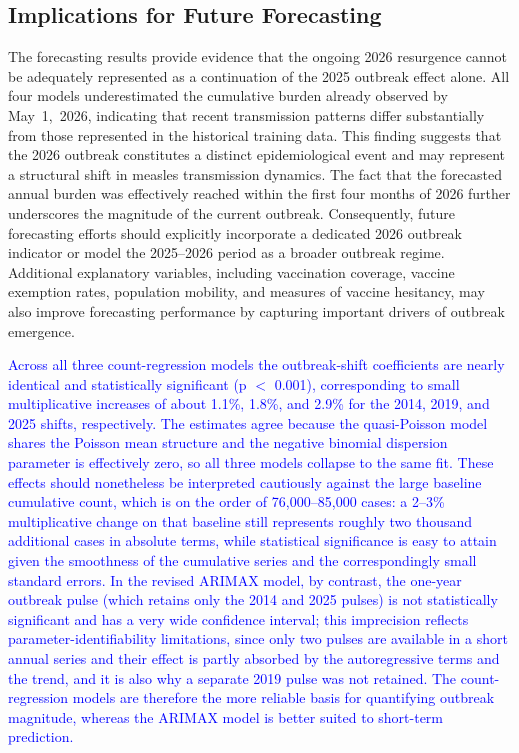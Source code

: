 \documentclass[utf8]{FrontiersinHarvard} %
\begin{document}
\subsection{Implications for Future Forecasting}
The forecasting results provide evidence that the ongoing 2026 resurgence cannot be adequately represented as a continuation of the 2025 outbreak effect alone. All four models underestimated the cumulative burden already observed by May~1,~2026, indicating that recent transmission patterns differ substantially from those represented in the historical training data. This finding suggests that the 2026 outbreak constitutes a distinct epidemiological event and may represent a structural shift in measles transmission dynamics.
The fact that the forecasted annual burden was effectively reached within the first four months of 2026 further underscores the magnitude of the current outbreak. Consequently, future forecasting efforts should explicitly incorporate a dedicated 2026 outbreak indicator or model the 2025--2026 period as a broader outbreak regime. Additional explanatory variables, including vaccination coverage, vaccine exemption rates, population mobility, and measures of vaccine hesitancy, may also improve forecasting performance by capturing important drivers of outbreak emergence.

\textcolor{blue}{Across all three count-regression models the outbreak-shift coefficients are nearly identical and statistically significant (p $<$ 0.001), corresponding to small multiplicative increases of about 1.1\%, 1.8\%, and 2.9\% for the 2014, 2019, and 2025 shifts, respectively. The estimates agree because the quasi-Poisson model shares the Poisson mean structure and the negative binomial dispersion parameter is effectively zero, so all three models collapse to the same fit. These effects should nonetheless be interpreted cautiously against the large baseline cumulative count, which is on the order of 76{,}000--85{,}000 cases: a 2--3\% multiplicative change on that baseline still represents roughly two thousand additional cases in absolute terms, while statistical significance is easy to attain given the smoothness of the cumulative series and the correspondingly small standard errors. In the revised ARIMAX model, by contrast, the one-year outbreak pulse (which retains only the 2014 and 2025 pulses) is not statistically significant and has a very wide confidence interval; this imprecision reflects parameter-identifiability limitations, since only two pulses are available in a short annual series and their effect is partly absorbed by the autoregressive terms and the trend, and it is also why a separate 2019 pulse was not retained. The count-regression models are therefore the more reliable basis for quantifying outbreak magnitude, whereas the ARIMAX model is better suited to short-term prediction.}
\end{document}

